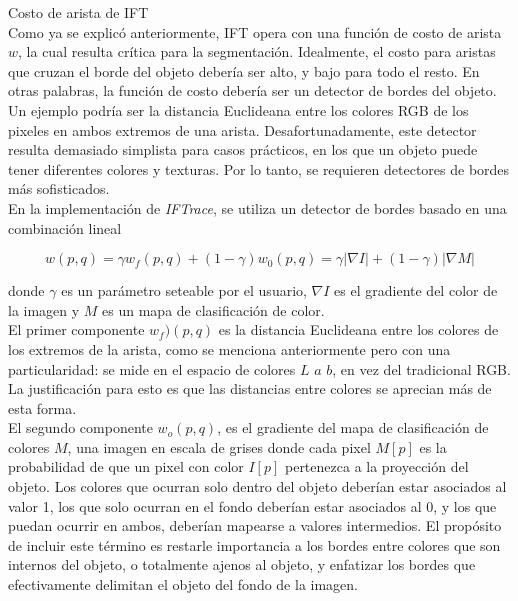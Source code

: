\documentclass[a4paper,10pt]{article}
\begin{document}
Costo de arista de IFT\\

Como ya se explicó anteriormente, IFT opera con una función de costo de arista
$w$, la cual resulta crítica para la segmentación. Idealmente, el costo 
para aristas que cruzan el borde del objeto debería ser alto, y bajo para todo
el resto. En otras palabras, la función de costo debería ser un detector
de bordes del objeto.\\
Un ejemplo podría ser la distancia Euclideana entre los colores RGB de los pixeles 
en ambos extremos de una arista. Desafortunadamente, este detector resulta demasiado 
simplista para casos prácticos, en los que un objeto puede tener diferentes colores y 
texturas. Por lo tanto, se requieren detectores de bordes más sofisticados.\\

En la implementación de \textit{IFTrace}, se utiliza un detector de bordes basado en
una combinación lineal

\begin{equation}
   \label{eq:IFTrace-edge-detector}
   w(p,q) = \gamma w_{f}(p,q) + (1 - \gamma)w_{0}(p,q) = \gamma |\nabla I| + (1 - \gamma)|\nabla M|
\end{equation}

donde $\gamma$ es un parámetro seteable por el usuario, $\nabla I$ es el gradiente
del color de la imagen y $M$ es un mapa de clasificación de color.\\

El primer componente $w_{f})(p,q)$ es la distancia Euclideana entre los colores de 
los extremos de la arista, como se menciona anteriormente pero con una particularidad:
se mide en el espacio de colores $L$ $a$ $b$, en vez del tradicional RGB. La 
justificación para esto es que las distancias entre colores se aprecian más de 
esta forma.\\

El segundo componente $w_{o}(p,q)$, es el gradiente del mapa de clasificación
de colores $M$, una imagen en escala de grises donde cada pixel $M[p]$ es
la probabilidad de que un pixel con color $I[p]$ pertenezca a la proyección
del objeto. Los colores que ocurran solo dentro del objeto deberían estar
asociados al valor 1, los que solo ocurran en el fondo deberían estar 
asociados al 0, y los que puedan ocurrir en ambos, deberían mapearse a 
valores intermedios. El propósito de incluir este término es restarle 
importancia a los bordes entre colores que son internos del objeto, o 
totalmente ajenos al objeto, y enfatizar los bordes que efectivamente 
delimitan el objeto del fondo de la imagen.\\
\end{document}
